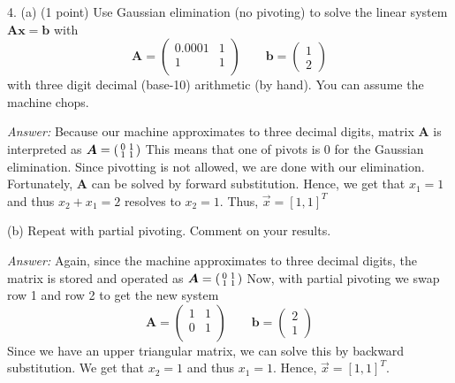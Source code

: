 \documentclass{article}
\begin{document}
    \vspace{0.5cm}
    4. (a) (1 point) Use Gaussian elimination (no pivoting) to solve the linear system $\bm{A}\bm{x}=\bm{b}$
    with $$\bm{A}=\begin{pmatrix}
        0.0001 & 1 \\
        1 & 1 \\
    \end{pmatrix} \qquad \bm{b} = \begin{pmatrix}
        1 \\ 2
    \end{pmatrix}$$
    with three digit decimal (base-10) arithmetic (by hand).  You can assume the machine chops.

    \textit{Answer:} Because our machine approximates to three decimal digits, matrix $\bm{A}$
    is interpreted as $\bm{A} = \begin{psmallmatrix}
        0 & 1 \\
        1 & 1 \\
    \end{psmallmatrix}$
    This means that one of pivots is 0 for the Gaussian elimination. Since pivotting is not
    allowed, we are done with our elimination. Fortunately, $\bm{A}$ can be solved by
    forward substitution. Hence, we get that $x_1 = 1$ and thus $x_2 + x_1 = 2$ resolves to
    $x_2 = 1$. Thus, $\vec{x} = [1,1]^T$

    (b) Repeat with partial pivoting. Comment on your results.

    \textit{Answer:} Again, since the machine approximates to three decimal digits,
    the matrix is stored and operated as
    $\bm{A} = \begin{psmallmatrix}
        0 & 1 \\
        1 & 1 \\
    \end{psmallmatrix}$
    Now, with partial pivoting we swap row 1 and row 2 to get the new system
    $$\bm{A}=\begin{pmatrix}
        1 & 1 \\
        0 & 1 \\
    \end{pmatrix} \qquad \bm{b} = \begin{pmatrix}
        2 \\ 1
    \end{pmatrix}$$
    Since we have an upper triangular matrix, we can solve this by backward substitution.
    We get that $x_2 = 1$ and thus $x_1 = 1$. Hence, $\vec{x} = [1,1]^T$.
\end{document}
